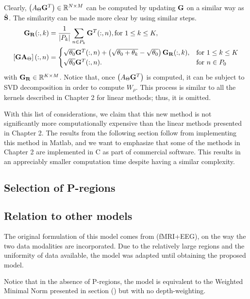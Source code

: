 Clearly, $\left( A_\Theta \mathbf{G}^T \right)\in \mathbb{R}^{N\times M}$ can be computed by updating $\mathbf{G}$ on a similar way as $\hat{\mathbf{S}}$.
%
The similarity can be made more clear by using similar steps.
\begin{align}
    \mathbf{G}_{\mathbf{R}}(:,k) 
    &= 
    \frac{1}{\left| {P_k} \right|} \sum_{n \in P_k} \mathbf{G}^T(:, n), 
    \text{for } 1\leq k \leq K,
    \\
    \left[ \mathbf{G} \mathbf{A}_\Theta \right](:, n) 
    &=
    \begin{cases}
    \sqrt{\theta_0} \mathbf{G}^T(:,n) 
     + \left( \sqrt{\theta_0+\theta_k}-\sqrt{\theta_0} \right) \mathbf{G}_{\mathbf{R}}(:,k), &\text{for } 1\leq k \leq K \\
    \sqrt{\theta_0} \mathbf{G}^T(:,n).
    &\text{for } n\in P_0
    \end{cases}
\end{align}
with $\mathbf{G}_{\mathbf{R}} \in \mathbb{R}^{K\times M}$.
%
Notice that, once $\left( A_\Theta \mathbf{G}^T \right)$ is computed, it can be subject to 
SVD decomposition in order to compute $W_\rho$.
%
This process is similar to all the kernels described in Chapter 2 for linear methods; thus, it is omitted.

With this list of considerations, we claim that this new method is not significantly more computationally expensive than the linear methods presented in Chapter 2.
%
The results from the following section follow from implementing this method in Matlab, and we want to emphasize that some of the methods in Chapter 2 are implemented in C as part of commercial software.
%
This results in an appreciably smaller computation time despite having a similar complexity.


\subsection{Selection of P-regions}
\label{sec:SelectPregions}

\subsection{Relation to other models}

The original formulation of this model comes from (fMRI+EEG), on the way the two data modalities are incorporated.
%
Due to the relatively large regions and the uniformity of data available, the model was adapted until obtaining the proposed model.

Notice that in the absence of P-regions, the model is equivalent to the Weighted Minimal Norm presented in section () but with no depth-weighting.

